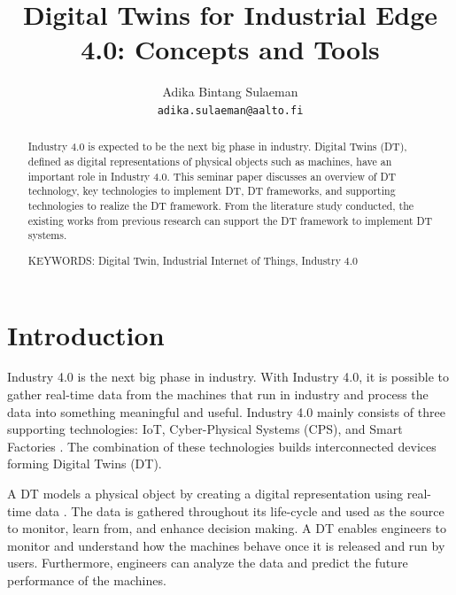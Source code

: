 \documentclass[article]{aaltoseries}
\begin{document}
 

\title{Digital Twins for Industrial Edge 4.0: Concepts and Tools}

\author{Adika Bintang Sulaeman%
\\\textnormal{\texttt{adika.sulaeman@aalto.fi}}} %


\maketitle


\begin{abstract}
  Industry 4.0 is expected to be the next big phase in industry. Digital Twins (DT), defined as digital representations of physical objects such as machines, have an important role in Industry 4.0. This seminar paper discusses an overview of DT technology, key technologies to implement DT, DT frameworks, and supporting technologies to realize the DT framework. From the literature study conducted, the existing works from previous research can support the DT framework to implement DT systems.
  
\vspace{3mm}
\noindent KEYWORDS: Digital Twin, Industrial Internet of Things, Industry 4.0

\end{abstract}




\section{Introduction}

Industry 4.0 is the next big phase in industry. With Industry 4.0, it is possible to gather real-time data from the machines that run in industry and process the data into something meaningful and useful. Industry 4.0 mainly consists of three supporting technologies: IoT, Cyber-Physical Systems (CPS), and Smart Factories \cite{hermann2016design}. The combination of these technologies builds interconnected devices forming Digital Twins (DT).

A DT models a physical object by creating a digital representation using real-time data \cite{Cheatshe3:online}. The data is gathered throughout its life-cycle and used as the source to monitor, learn from, and enhance decision making. A DT enables engineers to monitor and understand how the machines behave once it is released and run by users. Furthermore, engineers can analyze the data and predict the future performance of the machines.
\end{document}
